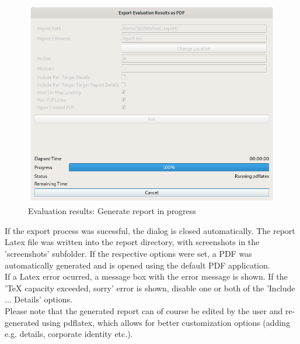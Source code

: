 \begin{figure}[H]
    \includegraphics[width=14cm]{../screenshots/eval_report_status.png}
  \caption{Evaluation results: Generate report in progress}
\end{figure}

If the export process was sucessful, the dialog is closed automatically. The report Latex file was written into the report directory, with screenshots in the 'screenshots' subfolder. If the respective options were set, a PDF was automatically generated and is opened using the default PDF application. \\

If a Latex error ocurred, a message box with the error message is shown. If the 'TeX capacity exceeded, sorry' error is shown, disable one or both of the 'Include ... Details' options.\\

Please note that the generated report can of course be edited by the user and re-generated using pdflatex, which allows for better customization options (adding e.g. details, corporate identity etc.).

